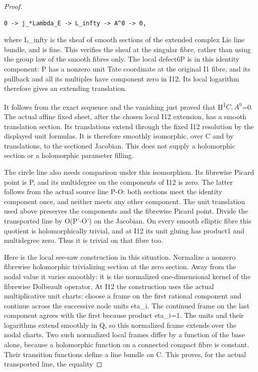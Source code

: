 \begin{proof}
\begin{lstlisting}
0 -> j_*Lambda_E -> L_infty -> A^0 -> 0,
\end{lstlisting}

where L\_infty is the sheaf of smooth sections of the extended complex Lie line bundle, and is fine. This verifies the sheaf at the singular fibre, rather than using the group law of the smooth fibres only. The local defect6P is in this identity component: P has a nonzero unit Tate coordinate at the original I1 fibre, and its pullback and all its multiples have component zero in I12. Its local logarithm therefore gives an extending translation.

It follows from the exact sequence and the vanishing just proved that H\textsuperscript{1}\(C,A^0\)=0. The actual affine fixed sheet, after the chosen local I12 extension, has a smooth translation section. Its translations extend through the fixed I12 resolution by the displayed unit formulas. It is therefore smoothly isomorphic, over C and by translations, to the sectioned Jacobian. This does not supply a holomorphic section or a holomorphic parameter filling.

The circle line also needs comparison under this isomorphism. Its fibrewise Picard point is P, and its multidegree on the components of I12 is zero. The latter follows from the actual source line P-O: both sections meet the identity component once, and neither meets any other component. The unit translation used above preserves the components and the fibrewise Picard point. Divide the transported line by O(P'-O') on the Jacobian. On every smooth elliptic fibre this quotient is holomorphically trivial, and at I12 its unit gluing has product1 and multidegree zero. Thus it is trivial on that fibre too.

Here is the local see-saw construction in this situation. Normalize a nonzero fibrewise holomorphic trivializing section at the zero section. Away from the nodal value it varies smoothly: it is the normalized one-dimensional kernel of the fibrewise Dolbeault operator. At I12 the construction uses the actual multiplicative unit charts: choose a frame on the first rational component and continue across the successive node units eta\_i. The continued frame on the last component agrees with the first because product eta\_i=1. The units and their logarithms extend smoothly in Q, so this normalized frame extends over the nodal charts. Two such normalized local frames differ by a function of the base alone, because a holomorphic function on a connected compact fibre is constant. Their transition functions define a line bundle on C. This proves, for the actual transported line, the equality


\end{proof}
